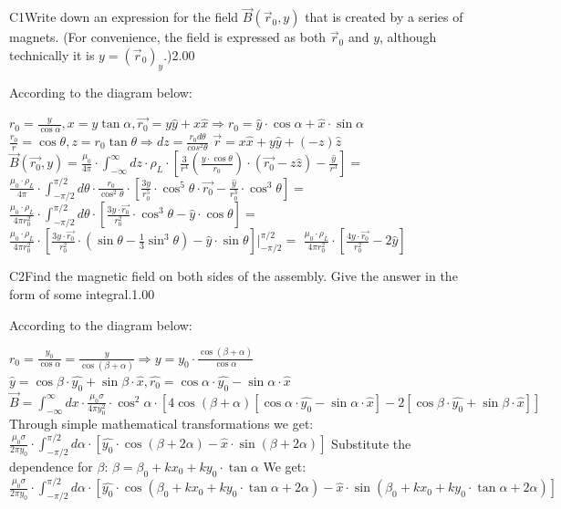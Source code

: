 \documentclass[11pt,a4paper]{article}
\begin{document}
\begin{solcard}{C1}{Write down an expression for the field $\vec B(\vec r_0, y)$ that is created by a series of magnets. (For convenience, the field is expressed as both $\vec r_0$ and $y$, although technically it is $y = (\vec r_0)_y$.)}{2.00}

According to the diagram below:


$r_0=\frac{y}{\cos \alpha}, x=y\tan \alpha, \vec{r_0} = y\hat{y} + x\hat{x} \Rightarrow r_0 = \hat{y}\cdot \cos \alpha +\hat{x} \cdot \sin \alpha$ $\frac{r_0}{r}=\cos \theta, z=r_0 \tan \theta \Rightarrow dz =\frac{r_0d\theta} {cos^2\theta}$ $\vec r=x\hat{x}+y\hat{y}+(-z)\hat{z}$ $\vec B(\vec{r_0},y)=\frac{\mu_0}{4 \pi}\cdot \int^\infty_{-\infty}dz \cdot \rho_L\cdot[\frac{3}{r^4} (\frac{y\cdot \cos \theta}{r_0}) \cdot (\vec{r_0}-z\hat{z})-\frac{\hat{y}}{r^3}]= $ $\frac{\mu_0\cdot\rho_L}{4\pi}\cdot \int^{\pi/2}_{-\pi/2}d\theta \cdot \frac{r_0}{\cos^2\theta}\cdot[ \frac{3y}{r_0^5}\cdot \cos^5\theta \cdot \vec{r_0} - \frac {\hat{y}}{r_0^3} \cdot \cos^3\theta]=$ $\frac{\mu_0\cdot\rho_L}{4\pi r_0^2}\cdot \int^{\pi/2}_{-\pi/2}d\theta\cdot[\frac{3y\cdot\vec{r_0}}{r_0^2} \cdot\cos^3\theta-\hat{y}\cdot\cos\theta]=$ $\frac{\mu_0\cdot\rho_L}{4\pi r_0^2}\cdot [\frac{3y\cdot\vec{r_0}}{r_0^2} \cdot(\sin\theta-\frac{1}{3}\sin^3\theta)- \hat{y}\cdot\sin\theta]|_{-\pi/2}^{\pi/2}=$ $\frac {\mu_0\cdot\rho_L} {4\pi r_0^2}\cdot[\frac{4y\cdot\vec{r_0}}{r_0^2}-2\hat{y}]$

\end{solcard}

\begin{solcard}{C2}{Find the magnetic field on both sides of the assembly. Give the answer in the form of some integral.}{1.00}

According to the diagram below:


$r_0=\frac{y_0}{\cos \alpha}=\frac{y}{\cos( \beta+\alpha)} \Rightarrow  y=y_0\cdot \frac {\cos(\beta+\alpha)}{\cos\alpha}$ $\hat{y}=\cos \beta \cdot \hat{y_0} +\sin \beta \cdot \hat{x}, \hat{r_0}=\cos \alpha \cdot \hat{y_0} - \sin \alpha \cdot \hat{x}$ $\vec B = \int_{-\infty}^{\infty} dx \cdot \frac {\mu_0\sigma}{4\pi y_0^2} \cdot \cos^2 \alpha \cdot [4\cos(\beta+\alpha)[\cos\alpha \cdot \hat{y_0}-\sin\alpha\cdot\hat{x}]- 2[\cos \beta \cdot \hat{y_0}+\sin \beta \cdot \hat{x}] ]$ Through simple mathematical transformations we get: $\frac{\mu_0\sigma}{2\pi y_0}\cdot \int _{-\pi/2}^{\pi/2} d\alpha\cdot [\hat{y_0}\cdot \cos(\beta+2\alpha)-\hat{x}\cdot\sin(\beta+2 \alpha)]$ Substitute the dependence for $\beta$: $\beta=\beta_0+kx_0+ky_0\cdot\tan \alpha$ We get: $\frac{\mu_0\sigma}{2\pi y_0}\cdot \int_{-\pi/2}^{\pi/2}d\alpha\cdot [\hat{y_0}\cdot\cos(\beta_0+kx_0+ky_0\cdot\tan\alpha +2\alpha)-\hat{x}\cdot\sin(\beta_0+kx_0+ky_0\cdot\tan\alpha+2\alpha)]$

\end{solcard}
\end{document}
